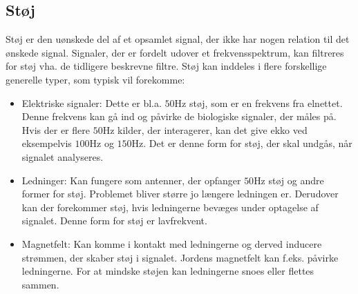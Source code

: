 \subsection{Støj}\label{StoejAfsnit}
Støj er den uønskede del af et opsamlet signal, der ikke har nogen relation til det ønskede signal. Signaler, der er fordelt udover et frekvensspektrum, kan filtreres for støj vha. de tidligere beskrevne filtre. \cite{Devasahayam2000,Wolf2004}
Støj kan inddeles i flere forskellige generelle typer, som typisk vil forekomme:

\begin{itemize}
\item Elektriske signaler: Dette er bl.a. $50$Hz støj, som er en frekvens fra elnettet. Denne frekvens kan gå ind og påvirke de biologiske signaler, der måles på. Hvis der er flere $50$Hz kilder, der interagerer, kan det give ekko ved eksempelvis $100$Hz og $150$Hz. Det er denne form for støj, der skal undgås, når signalet analyseres.
\item Ledninger: Kan fungere som antenner, der opfanger $50$Hz støj og andre former for støj. Problemet bliver større jo længere ledningen er. Derudover kan der forekommer støj, hvis ledningerne bevæges under optagelse af signalet. Denne form for støj er lavfrekvent. \cite{webster2009}
\item Magnetfelt: Kan komme i kontakt med ledningerne og derved inducere strømmen, der skaber støj i signalet. Jordens magnetfelt kan f.eks. påvirke ledningerne. For at mindske støjen kan ledningerne snoes eller flettes sammen. \cite{Wolf2004}
\end{itemize} 